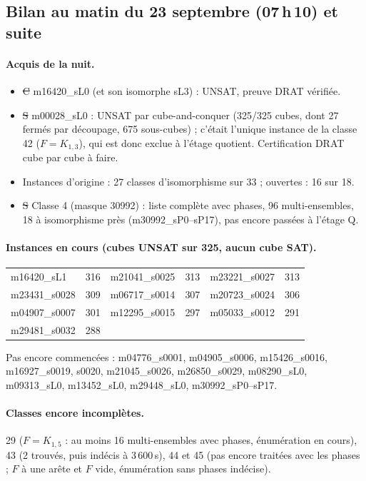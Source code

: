 \subsection{Bilan au matin du 23 septembre (07\,h\,10) et suite}
\paragraph{Acquis de la nuit.}
\begin{itemize}[nosep]
\item \st{C} m16420\_sL0 (et son isomorphe sL3) : UNSAT, preuve DRAT vérifiée.
\item \st{S} m00028\_sL0 : UNSAT par cube-and-conquer (325/325 cubes, dont 27 fermés par découpage, 675 sous-cubes) ; c'était l'unique instance de la
classe 42 ($F=K_{1,3}$), qui est donc exclue à l'étage quotient. Certification DRAT cube par cube à faire.
\item Instances d'origine : 27 classes d'isomorphisme sur 33 ; ouvertes : 16 sur 18.
\item \st{S} Classe 4 (masque 30992) : liste complète avec phases, 96 multi-ensembles, 18 à isomorphisme près (m30992\_sP0--sP17), pas encore passées à l'étage Q.
\end{itemize}
\paragraph{Instances en cours (cubes UNSAT sur 325, aucun cube SAT).}
\begin{center}\begin{tabular}{lr|lr|lr}
m16420\_sL1 & 316 & m21041\_s0025 & 313 & m23221\_s0027 & 313\\
m23431\_s0028 & 309 & m06717\_s0014 & 307 & m20723\_s0024 & 306\\
m04907\_s0007 & 301 & m12295\_s0015 & 297 & m05033\_s0012 & 291\\
m29481\_s0032 & 288 & & & &
\end{tabular}\end{center}
Pas encore commencées : m04776\_s0001, m04905\_s0006, m15426\_s0016, m16927\_s0019, s0020, m21045\_s0026, m26850\_s0029, m08290\_sL0, m09313\_sL0,
m13452\_sL0, m29448\_sL0, m30992\_sP0--sP17.
\paragraph{Classes encore incomplètes.} 29 ($F=K_{1,5}$ : au moins 16 multi-ensembles avec phases, énumération en cours), 43 (2 trouvés, puis
indécis à 3\,600\,s), 44 et 45 (pas encore traitées avec les phases ; $F$ à une arête et $F$ vide, énumération sans phases indécise).
